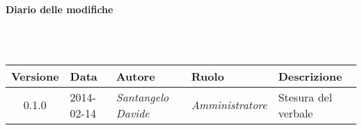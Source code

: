 \noindent\begin{Large}\textbf{Diario delle modifiche}\end{Large}\\
\\
\begin{small}
\begin{tabular}{|c|p{1.8cm}|p{2.8cm}|p{2.8cm}|p{3.5cm}|}
\hline
Versione & Data & Autore & Ruolo & Descrizione \\
\hline
\hline
0.1.0 & 2014-02-14 & 
\textit{Santangelo Davide} &
\textit{Amministratore} &  Stesura del verbale\\
\hline
\end{tabular}\\
\end{small}